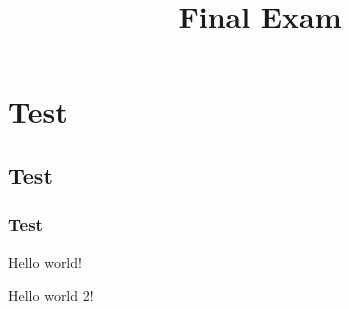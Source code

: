 \documentclass{cs161}
\title{Final Exam}
\begin{document}
\section{Test}
\subsection{Test}
\subsubsection{Test}

Hello world!

\pagebreak

Hello world 2!
\end{document}
